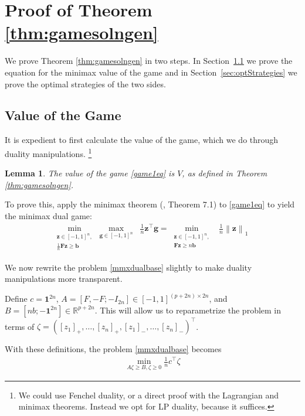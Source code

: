 \documentclass{colt2015} %
\newtheorem{lem}[thm]{Lemma}
\newcommand{\vF}{\mathbf{F}}
\newcommand{\vb}{\mathbf{b}}
\newcommand{\vg}{\mathbf{g}}
\newcommand{\vz}{\mathbf{z}}
\newcommand{\vnorm}[1]{\left\lVert#1\right\rVert} %
\begin{document}
\newpage
{}

\newpage
\appendix

\section{Proof of Theorem \ref{thm:gamesolngen}}
\label{sec:pfgame1}
We prove Theorem \ref{thm:gamesolngen} in two steps. In
Section~\ref{sec:valgame1} we prove the equation for the minimax value
of the game and in Section~\ref{sec:optStrategies} 
we prove the optimal strategies of the two sides.


\subsection{Value of the Game}
\label{sec:valgame1}

It is expedient to first calculate the value of the game, 
which we do through duality manipulations.
\footnote{
We could use Fenchel duality, or a direct proof with the Lagrangian and minimax theorems. 
Instead we opt for LP duality, because it suffices. }

\begin{lem}
\label{lem:valgame1}
The value of the game \eqref{game1eq} is $V$, as defined in Theorem \ref{thm:gamesolngen}.
\end{lem}

To prove this, 
apply the minimax theorem (\cite{CBL06}, Theorem 7.1) 
to \eqref{game1eq} to yield the minimax dual game: 
\begin{align}
\label{mmxdualbase}
\displaystyle \min_{\substack{ \vz \in [-1,1]^n , \\ \frac{1}{n} \vF \vz \geq \vb }} \max_{\vg \in [-1,1]^n} \;\; \frac{1}{n} \vz^\top \vg
= \min_{\substack{ \vz \in [-1,1]^n , \\ \vF \vz \geq n \vb }} \;\; \frac{1}{n} \vnorm{\vz }_1 \;\;
\end{align}

We now rewrite the problem \eqref{mmxdualbase} slightly to make duality manipulations more transparent. 

Define $c = \mathbf{1}^{2n}$, 
$A = [F, -F; - I_{2n}] \in [-1, 1]^{(p + 2n) \times 2n} $, 
and $B = [n b; -\mathbf{1}^{2n}] \in \mathbb{R}^{p + 2n}$. 
This will allow us to reparametrize the problem in terms of $\zeta = ([z_1]_{+}, \dots, [z_n]_{+}, [z_1]_{-}, \dots, [z_n]_{-})^\top$. 

With these definitions, 
the problem \eqref{mmxdualbase} becomes 
\begin{align}
\label{mmxdualnew}
\min_{A \zeta \geq B , \zeta \geq 0} \frac{1}{n} c^\top \zeta
\end{align}
\end{document}
